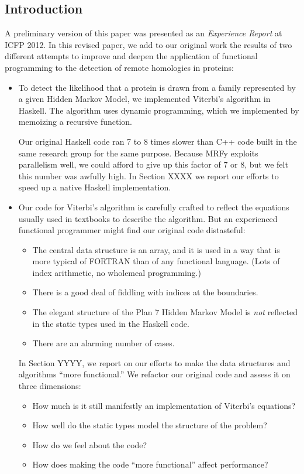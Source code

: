 \subsection{Introduction}

A preliminary version of this paper was presented as an \emph{Experience
Report} at ICFP 2012. In this revised paper, we add to our original work
the results of two different attempts to improve and deepen the
application of functional programming to the detection of remote
homologies in proteins:

\begin{itemize}
\item
  To detect the likelihood that a protein is drawn from a family
  represented by a given Hidden Markov Model, we implemented Viterbi's
  algorithm in Haskell. The algorithm uses dynamic programming, which we
  implemented by memoizing a recursive function.

  Our original Haskell code ran 7 to 8 times slower than C++ code built
  in the same research group for the same purpose. Because MRFy exploits
  parallelism well, we could afford to give up this factor of 7 or 8,
  but we felt this number was awfully high. In Section XXXX we report
  our efforts to speed up a native Haskell implementation.
\item
  Our code for Viterbi's algorithm is carefully crafted to reflect the
  equations usually used in textbooks to describe the algorithm. But an
  experienced functional programmer might find our original code
  distasteful:

  \begin{itemize}
  \item
    The central data structure is an array, and it is used in a way that
    is more typical of FORTRAN than of any functional language. (Lots of
    index arithmetic, no wholemeal programming.)
  \item
    There is a good deal of fiddling with indices at the boundaries.
  \item
    The elegant structure of the Plan 7 Hidden Markov Model is
    \emph{not} reflected in the static types used in the Haskell code.
  \item
    There are an alarming number of cases.
  \end{itemize}

  In Section YYYY, we report on our efforts to make the data structures
  and algorithms ``more functional.'' We refactor our original code and
  assess it on three dimensions:

  \begin{itemize}
  \item
    How much is it still manifestly an implementation of Viterbi's
    equations?
  \item
    How well do the static types model the structure of the problem?
  \item
    How do we feel about the code?
  \item
    How does making the code ``more functional'' affect performance?
  \end{itemize}
\end{itemize}

